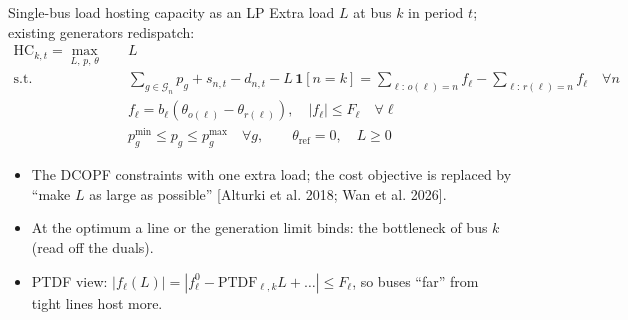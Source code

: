 \documentclass[aspectratio=169,11pt]{beamer}
\newcommand{\HC}{\ensuremath{\mathrm{HC}}}
\newcommand{\src}[1]{{\scriptsize\color{PurdueSteel}[#1]}}
\begin{document}
\begin{frame}{Single-bus load hosting capacity as an LP}
  Extra load $L$ at bus $k$ in period $t$; existing generators redispatch:
  \begin{align*}
    \HC_{k,t} = \max_{L,\,p,\,\theta} \quad & L\\
    \text{s.t.}\quad
    & \textstyle\sum_{g\in\mathcal G_n} p_g + s_{n,t} - d_{n,t} - L\,\mathbf{1}[n=k]
      = \sum_{\ell:\,o(\ell)=n} f_\ell - \sum_{\ell:\,r(\ell)=n} f_\ell \quad \forall n\\
    & f_\ell = b_\ell(\theta_{o(\ell)} - \theta_{r(\ell)}),\quad |f_\ell| \le F_\ell
      \quad \forall \ell\\
    & p_g^{\min} \le p_g \le p_g^{\max}\quad \forall g,\qquad \theta_{\mathrm{ref}} = 0,\quad L\ge 0
  \end{align*}
  \begin{itemize}
    \item The DCOPF constraints with one extra load; the cost objective is
      replaced by ``make $L$ as large as possible'' \src{Alturki et al. 2018; Wan et al. 2026}.
    \item At the optimum a line or the generation limit binds: the
      \alert{bottleneck} of bus $k$ (read off the duals).
    \item PTDF view: $|f_\ell(L)| = |f^0_\ell - \mathrm{PTDF}_{\ell,k}L + \dots| \le F_\ell$,
      so buses ``far'' from tight lines host more.
  \end{itemize}
\end{frame}
\end{document}
